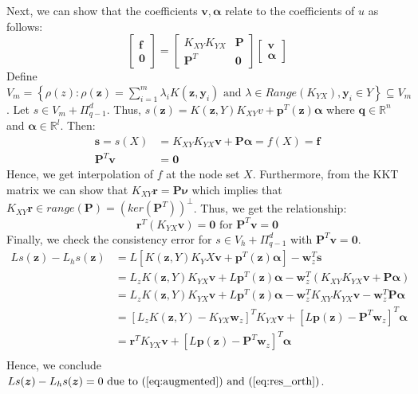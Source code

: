\documentclass[11pt]{article}
\begin{document}
Next, we can show that the coefficients $\bm{v}, \bm{\alpha}$ relate to the coefficients of $u$ as follows:
\begin{equation*}
	\begin{bmatrix}
		\bm{f} \\ \bm{0}
	\end{bmatrix} = 
	\begin{bmatrix}
		K_{XY} K_{YX} & \bm{P} \\
		\bm{P}^T & \bm{0}
	\end{bmatrix}
	\begin{bmatrix}
		\bm{v} \\ \bm{\alpha}
	\end{bmatrix}
\end{equation*}
Define $V_m = \left\{ \rho(z) : \rho(\bm{z}) = \sum_{i=1}^m \lambda_i K(\bm{z},\bm{y}_i) \text{ and } \lambda \in Range\left(K_{YX} \right), \bm{y}_i \in Y \right\} \subseteq V_m$. Let $s \in V_m + \Pi_{q-1}^d$. Thus, $s(\bm{z}) = K(\bm{z},Y)K_{XY} v + \bm{p}^T(\bm{z}) \bm{\alpha}$ where $\bm{q} \in \mathbb{R}^{n}$ and $\bm{\alpha} \in \mathbb{R}^{l}$. Then:
\begin{align*}
	\bm{s} = s(X) &= K_{XY} K_{YX} \bm{v} + \bm{P} \bm{\alpha} = f(X) = \bm{f}\\
	\bm{P}^T \bm{v} &= \bm{0}
\end{align*}
Hence, we get interpolation of $f$ at the node set $X$. Furthermore, from the KKT matrix we can show that $K_{XY} \bm{r} = \bm{P} \bm{\nu}$ which implies that $K_{XY} \bm{r} \in range(\bm{P}) = \left( ker \left(\bm{P}^T \right) \right)^\perp$. Thus, we get the relationship:
\begin{equation}
\bm{r}^T \left( K_{YX} \bm{v} \right)=\bm{0} \text{ for } \bm{P}^T \bm{v} = \bm{0} \label{eq:res_orth}
\end{equation}
Finally, we check the consistency error for $s \in V_h+\Pi_{q-1}^d$ with $\bm{P}^T \bm{v}=\bm{0}$.
\begin{align*}
	Ls(\bm{z})-L_hs(\bm{z}) &= L\left[K(\bm{z},Y)K_YX \bm{v} + \bm{p}^T(\bm{z}) \bm{\alpha}\right] - \bm{w}^T_z\bm{s}\\
	&= L_z K(\bm{z},Y)K_{YX} \bm{v} + L\bm{p}^T(\bm{z}) \bm{\alpha} - \bm{w}^T_z(K_{XY} K_{YX} \bm{v} + \bm{P} \bm{\alpha})\\
	&= L_z K(\bm{z},Y)K_{YX} \bm{v} + L\bm{p}^T(\bm{z}) \bm{\alpha} - \bm{w}^T_z K_{XY} K_{YX} \bm{v} - \bm{w}^T_z \bm{P} \bm{\alpha}\\
	&= \left[ L_z K(\bm{z},Y) - K_{YX} \bm{w}_z \right]^T K_{YX} \bm{v} + \left[ L\bm{p}(\bm{z}) - \bm{P}^T \bm{w}_z \right]^T \bm{\alpha}\\
	&= \bm{r}^T K_{YX} \bm{v} + \left[ L\bm{p}(\bm{z}) - \bm{P}^T \bm{w}_z \right]^T \bm{\alpha}\\
\end{align*}
Hence, we conclude $Ls(\bm{z})-L_hs(\bm{z}) = 0 \text{ due to (\ref{eq:augmented}) and (\ref{eq:res_orth}}) \label{eq:repro}$.
\end{document}
